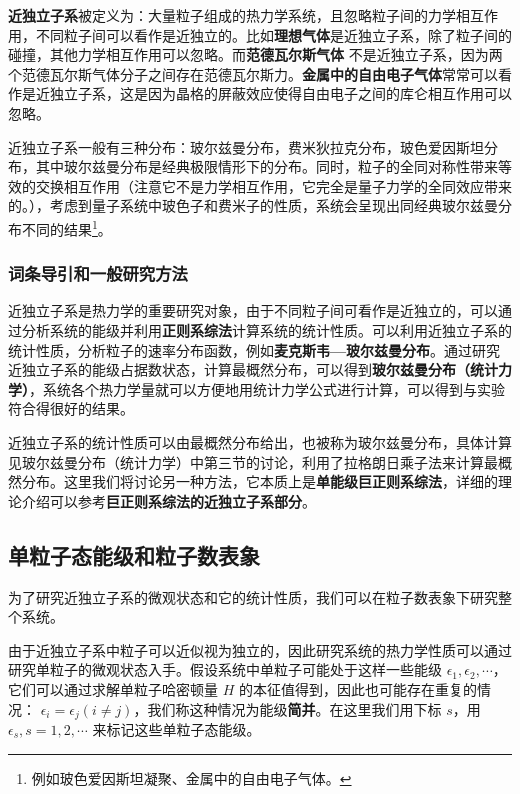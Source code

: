 

\textbf{近独立子系}被定义为：大量粒子组成的热力学系统，且忽略粒子间的力学相互作用，不同粒子间可以看作是近独立的。比如\textbf{理想气体}是近独立子系，除了粒子间的碰撞，其他力学相互作用可以忽略。而\textbf{范德瓦尔斯气体} 不是近独立子系，因为两个范德瓦尔斯气体分子之间存在范德瓦尔斯力。\textbf{金属中的自由电子气体}常常可以看作是近独立子系，这是因为晶格的屏蔽效应使得自由电子之间的库仑相互作用可以忽略。

近独立子系一般有三种分布：玻尔兹曼分布，费米狄拉克分布，玻色爱因斯坦分布，其中玻尔兹曼分布是经典极限情形下的分布。同时，粒子的全同对称性带来等效的交换相互作用（注意它不是力学相互作用，它完全是量子力学的全同效应带来的。），考虑到量子系统中玻色子和费米子的性质，系统会呈现出同经典玻尔兹曼分布不同的结果\footnote{例如玻色爱因斯坦凝聚、金属中的自由电子气体。}。

\subsubsection{词条导引和一般研究方法}
近独立子系是热力学的重要研究对象，由于不同粒子间可看作是近独立的，可以通过分析系统的能级并利用\textbf{正则系综法}计算系统的统计性质。可以利用近独立子系的统计性质，分析粒子的速率分布函数，例如\textbf{麦克斯韦—玻尔兹曼分布}。通过研究近独立子系的能级占据数状态，计算最概然分布，可以得到\textbf{玻尔兹曼分布（统计力学）}，系统各个热力学量就可以方便地用统计力学公式进行计算，可以得到与实验符合得很好的结果。

近独立子系的统计性质可以由最概然分布给出，也被称为玻尔兹曼分布，具体计算见玻尔兹曼分布（统计力学）中第三节的讨论，利用了拉格朗日乘子法来计算最概然分布。这里我们将讨论另一种方法，它本质上是\textbf{单能级巨正则系综法}，详细的理论介绍可以参考\textbf{巨正则系综法的近独立子系部分}。

\subsection{单粒子态能级和粒子数表象}
为了研究近独立子系的微观状态和它的统计性质，我们可以在粒子数表象下研究整个系统。

由于近独立子系中粒子可以近似视为独立的，因此研究系统的热力学性质可以通过研究单粒子的微观状态入手。假设系统中单粒子可能处于这样一些能级 $\epsilon_1,\epsilon_2,\cdots$，它们可以通过求解单粒子哈密顿量 $H$ 的本征值得到，因此也可能存在重复的情况： $\epsilon_i=\epsilon_j(i\neq j)$，我们称这种情况为能级\textbf{简并}。在这里我们用下标 $s$，用 $\epsilon_s,s=1,2,\cdots$ 来标记这些单粒子态能级。

